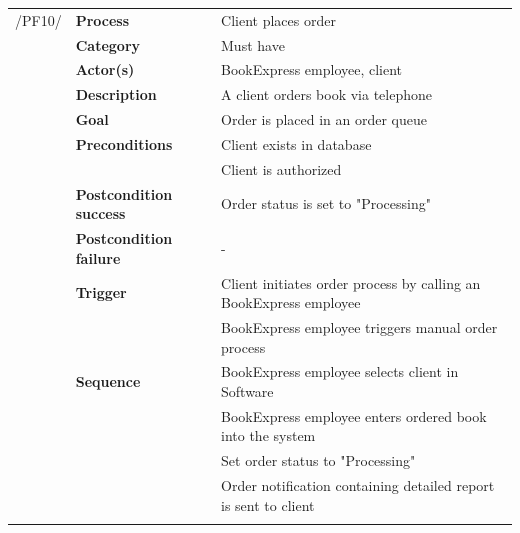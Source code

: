 \documentclass[11pt,a4paper,oneside,svgnames]{report}
\begin{document}
\noindent
\begin{tabular}{p{1.5cm}p{3cm}p{8cm}}
\cellcolor{white}	 /PF10/	& \textbf{Process} & Client places order\\ 
\cellcolor{white}		& \textbf{Category} & Must have\\
\cellcolor{white}		& \textbf{Actor(s)} & BookExpress employee, client\\ 
\cellcolor{white}		& \textbf{Description}	 & A client orders book via telephone\\ 
\cellcolor{white}		& \textbf{Goal} & Order is placed in an order queue\\
\cellcolor{white}		& \textbf{Preconditions} & Client exists in database\\
\cellcolor{white}		& & Client is authorized\\
\cellcolor{white}		& \textbf{Postcondition success} & Order status is set to "Processing"\\
\cellcolor{white}		& \textbf{Postcondition failure} & -\\
\cellcolor{white}		& \textbf{Trigger} & Client initiates order process by calling an BookExpress employee\\
\cellcolor{white}		& & BookExpress employee triggers manual order process\\
\cellcolor{white}		& \textbf{Sequence} & BookExpress employee selects client in Software\\
\cellcolor{white}		& & BookExpress employee enters ordered book into the system\\
\cellcolor{white}		& & Set order status to "Processing"\\
\cellcolor{white}		& & Order notification containing detailed report is sent to client\\
\cellcolor{white}\hfill \\
\end{tabular}
\end{document}
